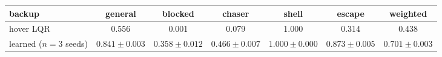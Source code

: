 \begin{tabular}{lcccccc}\toprule
backup & general & blocked & chaser & shell & escape & weighted\\\midrule
hover LQR & 0.556 & 0.001 & 0.079 & 1.000 & 0.314 & 0.438\\
learned ($n=3$ seeds) & $0.841\pm0.003$ & $0.358\pm0.012$ & $0.466\pm0.007$ & $1.000\pm0.000$ & $0.873\pm0.005$ & $0.701\pm0.003$\\\bottomrule\end{tabular}
